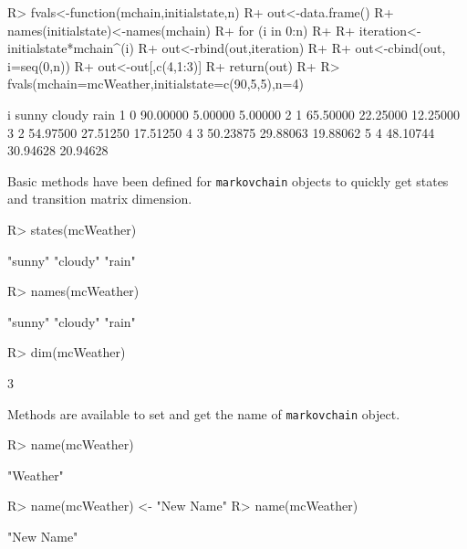 \documentclass[
  nojss]{jss}
\begin{document}
\begin{CodeChunk}

\begin{CodeInput}
R> fvals<-function(mchain,initialstate,n) {
R+   out<-data.frame()
R+   names(initialstate)<-names(mchain)
R+   for (i in 0:n)
R+   {
R+     iteration<-initialstate*mchain^(i)
R+     out<-rbind(out,iteration)
R+   }
R+   out<-cbind(out, i=seq(0,n))
R+   out<-out[,c(4,1:3)]
R+   return(out)
R+ }
R> fvals(mchain=mcWeather,initialstate=c(90,5,5),n=4)
\end{CodeInput}

\begin{CodeOutput}
  i    sunny   cloudy     rain
1 0 90.00000  5.00000  5.00000
2 1 65.50000 22.25000 12.25000
3 2 54.97500 27.51250 17.51250
4 3 50.23875 29.88063 19.88062
5 4 48.10744 30.94628 20.94628
\end{CodeOutput}
\end{CodeChunk}

Basic methods have been defined for \texttt{markovchain} objects to quickly get states and transition matrix dimension.

\begin{CodeChunk}

\begin{CodeInput}
R> states(mcWeather)
\end{CodeInput}

\begin{CodeOutput}
[1] "sunny"  "cloudy" "rain"  
\end{CodeOutput}

\begin{CodeInput}
R> names(mcWeather)
\end{CodeInput}

\begin{CodeOutput}
[1] "sunny"  "cloudy" "rain"  
\end{CodeOutput}

\begin{CodeInput}
R> dim(mcWeather)
\end{CodeInput}

\begin{CodeOutput}
[1] 3
\end{CodeOutput}
\end{CodeChunk}

Methods are available to set and get the name of \texttt{markovchain} object.

\begin{CodeChunk}

\begin{CodeInput}
R> name(mcWeather)
\end{CodeInput}

\begin{CodeOutput}
[1] "Weather"
\end{CodeOutput}

\begin{CodeInput}
R> name(mcWeather) <- "New Name"
R> name(mcWeather)
\end{CodeInput}

\begin{CodeOutput}
[1] "New Name"
\end{CodeOutput}
\end{CodeChunk}
\end{document}
